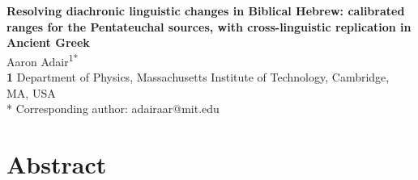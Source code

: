 \documentclass[10pt,letterpaper]{article}
\begin{document}
\vspace*{0.2in}

\begin{flushleft}
{\Large
\textbf{Resolving diachronic linguistic changes in Biblical Hebrew:
calibrated ranges for the Pentateuchal sources, with
cross-linguistic replication in Ancient Greek}
}
\newline
\\
Aaron Adair\textsuperscript{1*}
\\
\bigskip
\textbf{1} Department of Physics, Massachusetts Institute of Technology, Cambridge, MA, USA
\\
\bigskip
* Corresponding author: adairaar@mit.edu

\end{flushleft}

\section*{Abstract}
\end{document}
